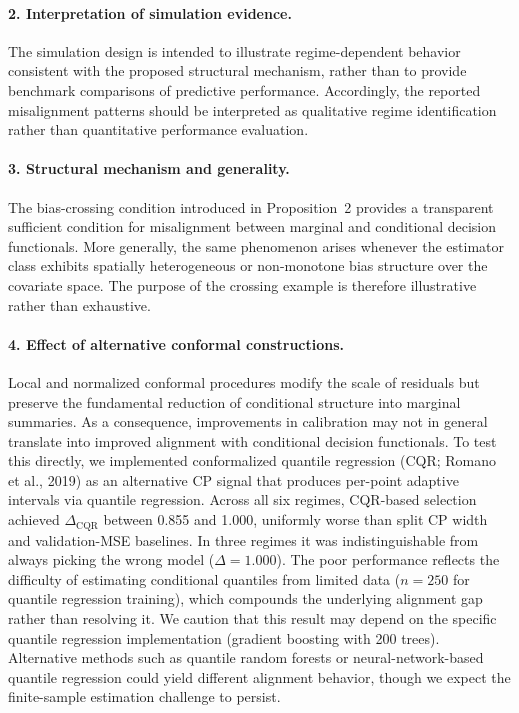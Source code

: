 \documentclass[pdflatex,sn-mathphys-ay]{sn-jnl}%
\theoremstyle{thmstyleone}%
\theoremstyle{thmstyletwo}%
\theoremstyle{thmstylethree}%
\begin{document}
\paragraph{2. Interpretation of simulation evidence.}
The simulation design is intended to illustrate regime-dependent behavior consistent with the proposed structural mechanism, rather than to provide benchmark comparisons of predictive performance. Accordingly, the reported misalignment patterns should be interpreted as qualitative regime identification rather than quantitative performance evaluation.

\paragraph{3. Structural mechanism and generality.}
The bias-crossing condition introduced in Proposition~2 provides a transparent sufficient condition for misalignment between marginal and conditional decision functionals. More generally, the same phenomenon arises whenever the estimator class exhibits spatially heterogeneous or non-monotone bias structure over the covariate space. The purpose of the crossing example is therefore illustrative rather than exhaustive.

\paragraph{4. Effect of alternative conformal constructions.}
Local and normalized conformal procedures modify the scale of residuals but preserve the fundamental reduction of conditional structure into marginal summaries. As a consequence, improvements in calibration may not in general translate into improved alignment with conditional decision functionals. To test this directly, we implemented conformalized quantile regression (CQR; Romano et al., 2019) as an alternative CP signal that produces per-point adaptive intervals via quantile regression. Across all six regimes, CQR-based selection achieved $\Delta_{\text{CQR}}$ between 0.855 and 1.000, uniformly worse than split CP width and validation-MSE baselines. In three regimes it was indistinguishable from always picking the wrong model ($\Delta = 1.000$). The poor performance reflects the difficulty of estimating conditional quantiles from limited data ($n=250$ for quantile regression training), which compounds the underlying alignment gap rather than resolving it. We caution that this result may depend on the specific quantile regression implementation (gradient boosting with 200 trees). Alternative methods such as quantile random forests or neural-network-based quantile regression could yield different alignment behavior, though we expect the finite-sample estimation challenge to persist.
\end{document}
